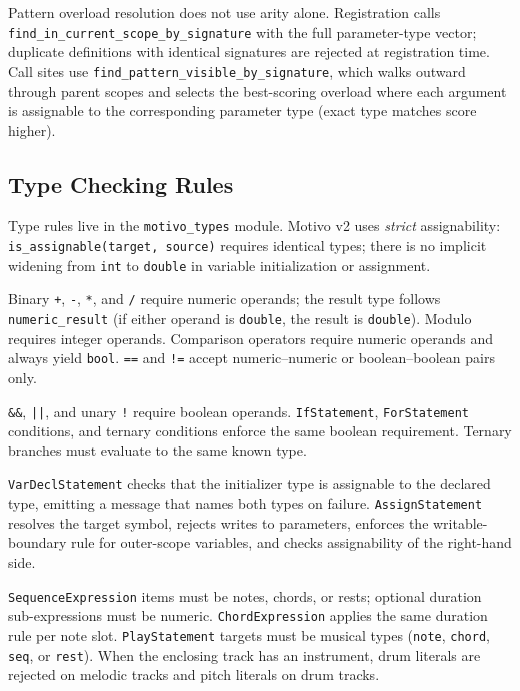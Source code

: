 Pattern overload resolution does not use arity alone.
Registration calls \texttt{find\_in\_current\_scope\_by\_signature} with the full parameter-type vector; duplicate
definitions with identical signatures are rejected at registration time.
Call sites use \texttt{find\_pattern\_visible\_by\_signature}, which walks outward through parent scopes and selects
the best-scoring overload where each argument is assignable to the corresponding parameter type (exact type matches
score higher).

\subsection{Type Checking Rules}\label{detail-subsec:semantic-type-checking}

Type rules live in the \texttt{motivo\_types} module.
Motivo v2 uses \emph{strict} assignability: \texttt{is\_assignable(target, source)} requires identical types; there is
no implicit widening from \texttt{int} to \texttt{double} in variable initialization or assignment.

Binary \texttt{+}, \texttt{-}, \texttt{*}, and \texttt{/} require numeric operands; the result type follows
\texttt{numeric\_result} (if either operand is \texttt{double}, the result is \texttt{double}).
Modulo requires integer operands.
Comparison operators require numeric operands and always yield \texttt{bool}.
\texttt{==} and \texttt{!=} accept numeric--numeric or boolean--boolean pairs only.

\texttt{\&\&}, \texttt{||}, and unary \texttt{!} require boolean operands.
\texttt{IfStatement}, \texttt{ForStatement} conditions, and ternary conditions enforce the same boolean requirement.
Ternary branches must evaluate to the same known type.

\texttt{VarDeclStatement} checks that the initializer type is assignable to the declared type, emitting a message that
names both types on failure.
\texttt{AssignStatement} resolves the target symbol, rejects writes to parameters, enforces the writable-boundary rule
for outer-scope variables, and checks assignability of the right-hand side.

\texttt{SequenceExpression} items must be notes, chords, or rests; optional duration sub-expressions must be numeric.
\texttt{ChordExpression} applies the same duration rule per note slot.
\texttt{PlayStatement} targets must be musical types (\texttt{note}, \texttt{chord}, \texttt{seq}, or \texttt{rest}).
When the enclosing track has an instrument, drum literals are rejected on melodic tracks and pitch literals on drum
tracks.

